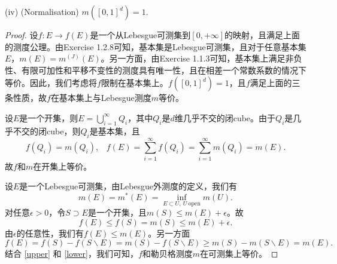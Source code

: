 \documentclass[reqno,a4paper,14pt]{amsart}
\begin{document}
(iv) (Normalisation) $m([0,1]^d)=1$.
\begin{proof}
    设$f:E\to f(E)$是一个从Lebesgue可测集到$[0,+\infty]$的映射，且满足上面的测度公理。由Exercise 1.2.8可知，基本集是Lebesgue可测集，且对于任意基本集$E$，$m(E)=m^{(J)}(E)$。另一方面，由Exercise 1.1.3可知，基本集上满足非负性、有限可加性和平移不变性的测度具有唯一性，且在相差一个常数系数的情况下等价。因此，我们考虑将$f$限制在基本集上。$f([0,1]^d)=1$，且$f$满足上面的三条性质，故$f$在基本集上与Lebesgue测度$m$等价。

    设$E$是一个开集，则$E=\bigcup_{i=1}^\infty Q_i$，其中$Q_i$是$d$维几乎不交的闭cube。由于$Q_i$是几乎不交的闭cube，则$Q_i$是基本集，且
    \begin{equation*}
        f(Q_i)=m(Q_i),\;\;\; f(E)=\sum_{i=1}^\infty f(Q_i)=\sum_{i=1}^\infty m(Q_i)=m(E).
    \end{equation*}
    故$f$和$m$在开集上等价。

    设$E$是一个Lebesgue可测集，由Lebesgue外测度的定义，我们有
    \begin{equation*}
        m(E)=m^*(E)=\inf_{E\subset U,\ U\ \mathrm{open}} m(U).
    \end{equation*}
    对任意$\epsilon>0$，令$S\supset E$是一个开集，且$m(S)\leq m(E)+\epsilon$。故
    \begin{equation}
        f(E)\leq f(S)=m(S)\leq m(E)+\epsilon.
        \label{upper}
    \end{equation}
    由$\epsilon$的任意性，我们有$f(E)\leq m(E)$。另一方面
    \begin{equation}
        f(E)=f(S)-f(S\backslash E)=m(S)-f(S\backslash E)\geq m(S)-m(S\backslash E)=m(E).
        \label{lower}
    \end{equation}
    结合 \eqref{upper} 和 \eqref{lower}，我们可知，$f$和勒贝格测度$m$在可测集上等价。
\end{proof}
\end{document}
